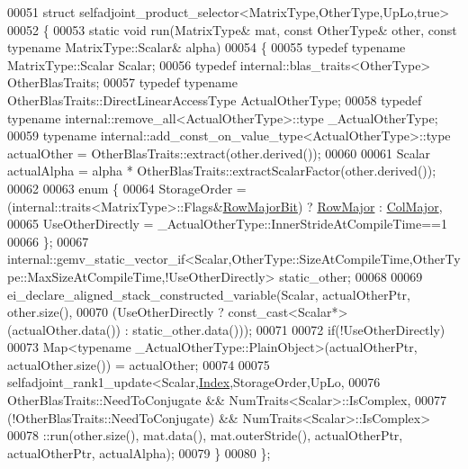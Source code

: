 \begin{DoxyCode}
00051 \textcolor{keyword}{struct }selfadjoint\_product\_selector<MatrixType,OtherType,UpLo,true>
00052 \{
00053   \textcolor{keyword}{static} \textcolor{keywordtype}{void} run(MatrixType& mat, \textcolor{keyword}{const} OtherType& other, \textcolor{keyword}{const} \textcolor{keyword}{typename} MatrixType::Scalar& alpha)
00054   \{
00055     \textcolor{keyword}{typedef} \textcolor{keyword}{typename} MatrixType::Scalar Scalar;
00056     \textcolor{keyword}{typedef} internal::blas\_traits<OtherType> OtherBlasTraits;
00057     \textcolor{keyword}{typedef} \textcolor{keyword}{typename} OtherBlasTraits::DirectLinearAccessType ActualOtherType;
00058     \textcolor{keyword}{typedef} \textcolor{keyword}{typename} internal::remove\_all<ActualOtherType>::type \_ActualOtherType;
00059     \textcolor{keyword}{typename} internal::add\_const\_on\_value\_type<ActualOtherType>::type actualOther = 
      OtherBlasTraits::extract(other.derived());
00060 
00061     Scalar actualAlpha = alpha * OtherBlasTraits::extractScalarFactor(other.derived());
00062 
00063     \textcolor{keyword}{enum} \{
00064       StorageOrder = (internal::traits<MatrixType>::Flags&\hyperlink{group__flags_gae4f56c2a60bbe4bd2e44c5b19cbe8762}{RowMajorBit}) ? 
      \hyperlink{group__enums_ggaacded1a18ae58b0f554751f6cdf9eb13acfcde9cd8677c5f7caf6bd603666aae3}{RowMajor} : \hyperlink{group__enums_ggaacded1a18ae58b0f554751f6cdf9eb13a0cbd4bdd0abcfc0224c5fcb5e4f6669a}{ColMajor},
00065       UseOtherDirectly = \_ActualOtherType::InnerStrideAtCompileTime==1
00066     \};
00067     
      internal::gemv\_static\_vector\_if<Scalar,OtherType::SizeAtCompileTime,OtherType::MaxSizeAtCompileTime,!UseOtherDirectly> static\_other;
00068 
00069     ei\_declare\_aligned\_stack\_constructed\_variable(Scalar, actualOtherPtr, other.size(),
00070       (UseOtherDirectly ? \textcolor{keyword}{const\_cast<}Scalar*\textcolor{keyword}{>}(actualOther.data()) : static\_other.data()));
00071       
00072     \textcolor{keywordflow}{if}(!UseOtherDirectly)
00073       Map<typename \_ActualOtherType::PlainObject>(actualOtherPtr, actualOther.size()) = actualOther;
00074     
00075     selfadjoint\_rank1\_update<Scalar,\hyperlink{namespace_eigen_a62e77e0933482dafde8fe197d9a2cfde}{Index},StorageOrder,UpLo,
00076                               OtherBlasTraits::NeedToConjugate  && NumTraits<Scalar>::IsComplex,
00077                             (!OtherBlasTraits::NeedToConjugate) && NumTraits<Scalar>::IsComplex>
00078           ::run(other.size(), mat.data(), mat.outerStride(), actualOtherPtr, actualOtherPtr, actualAlpha);
00079   \}
00080 \};

\end{DoxyCode}

